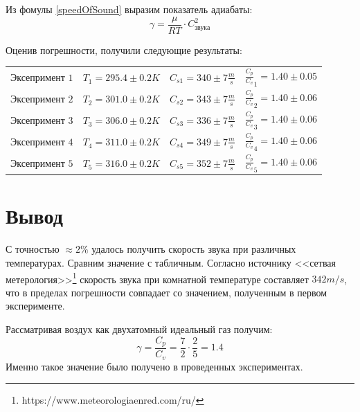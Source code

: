 \documentclass{article}
\begin{document}
Из фомулы \eqref{speedOfSound} выразим показатель адиабаты:
\begin{equation}
    \gamma = \frac{\mu}{R T} \cdot C_{\text{звука}}^2
\end{equation}

Оценив погрешности, получили следующие результаты:
\newpage
\begin{table}[h]
\centering
\begin{tabular}{ l c c r }
$ \text{Эксепримент 1} $ & $T_{1} = 295.4 \pm 0.2 K$ & $C_{s1} = 340 \pm 7 \frac{m}{s}$ & $\frac{C_{p}}{C_{v}}_{1} = 1.40 \pm 0.05 $\\
$ \text{Эксепримент 2} $ & $T_{2} = 301.0 \pm 0.2 K$ & $C_{s2} = 343 \pm 7 \frac{m}{s}$ & $\frac{C_{p}}{C_{v}}_{2} = 1.40 \pm 0.06 $\\
$  \text{Эксепримент 3}$ & $T_{3} = 306.0 \pm 0.2 K$ & $C_{s3} = 336 \pm 7 \frac{m}{s}$ & $\frac{C_{p}}{C_{v}}_{3} = 1.40 \pm 0.06 $\\
$ \text{Эксепримент 4} $ & $T_{4} = 311.0 \pm 0.2 K$ & $C_{s4} = 349 \pm 7 \frac{m}{s}$ & $\frac{C_{p}}{C_{v}}_{4} = 1.40 \pm 0.06 $\\
$ \text{Эксепримент 5} $ & $T_{5} = 316.0 \pm 0.2 K$ & $C_{s5} = 352 \pm 7 \frac{m}{s}$ & $\frac{C_{p}}{C_{v}}_{5} = 1.40 \pm 0.06 $\\
\end{tabular}
\end{table}
\section{Вывод}
С точностью $\approx 2\%$ удалось получить скорость звука при различных температурах. 
Сравним значение с табличным. Согласно источнику <<сетвая метерология>>\footnote{https://www.meteorologiaenred.com/ru/} скорость звука при комнатной температуре составляет $342 m/s$, что в пределах погрешности совпадает со значением, полученным в первом эксперименте.

Рассматривая воздух как двухатомный идеальный газ получим:
\begin{equation*}
    \gamma = \frac{C_p}{C_v} = \frac{7}{2} \cdot \frac{2}{5} = 1.4
\end{equation*}
Именно такое значение было получено в проведенных экспериментах.
\end{document}

